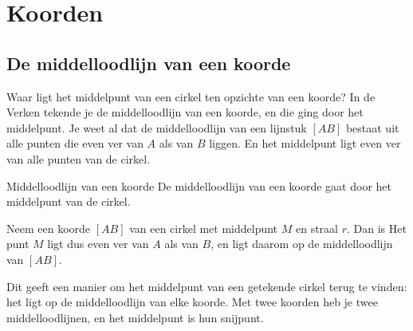 \section{Koorden}

\subsection{De middelloodlijn van een koorde}

Waar ligt het middelpunt van een cirkel ten opzichte van een koorde? In de Verken tekende je de middelloodlijn van een koorde, en die ging door het middelpunt. Je weet al dat de middelloodlijn van een lijnstuk $[AB]$ bestaat uit alle punten die even ver van $A$ als van $B$ liggen. En het middelpunt ligt even ver van alle punten van de cirkel.

\begin{theorie}
\begin{minipage}[t]{.64\linewidth}
\vspace{0pt}
\begin{stelling}{Middelloodlijn van een koorde}
De middelloodlijn van een koorde gaat door het middelpunt van de cirkel.
\end{stelling}

\begin{bewijs}
Neem een koorde $[AB]$ van een cirkel met middelpunt $M$ en straal $r$. Dan is
Het punt $M$ ligt dus even ver van $A$ als van $B$, en ligt daarom op de middelloodlijn van $[AB]$.
\end{bewijs}
\end{minipage}\hfill
\begin{minipage}[t]{.32\linewidth}
\vspace{0pt}
\centering
{}
\end{minipage}
\end{theorie}

Dit geeft een manier om het middelpunt van een getekende cirkel terug te vinden: het ligt op de middelloodlijn van elke koorde. Met twee koorden heb je twee middelloodlijnen, en het middelpunt is hun snijpunt.

